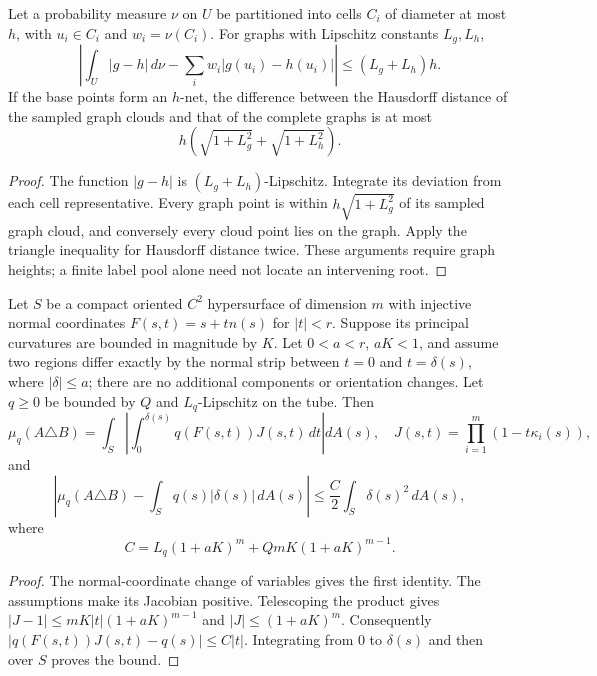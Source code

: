 \begin{proposition}
\label{rthreegeo:quadrature}
Let a probability measure $\nu$ on $U$ be partitioned into cells $C_i$
of diameter at most $h$, with $u_i\in C_i$ and $w_i=\nu(C_i)$.
For graphs with Lipschitz constants $L_g,L_h$,
\[
 \left|\int_U|g-h|\,d\nu-
 \sum_iw_i|g(u_i)-h(u_i)|\right|\le(L_g+L_h)h.
\]
If the base points form an $h$-net, the difference between the Hausdorff
distance of the sampled graph clouds and that of the complete graphs
is at most
\[
 h\left(\sqrt{1+L_g^2}+\sqrt{1+L_h^2}\right).
\]
\end{proposition}
\begin{proof}
The function $|g-h|$ is $(L_g+L_h)$-Lipschitz. Integrate its deviation
from each cell representative. Every graph point is within
$h\sqrt{1+L_g^2}$ of its sampled graph cloud, and conversely every cloud
point lies on the graph. Apply the triangle inequality for Hausdorff
distance twice. These arguments require graph heights; a finite label
pool alone need not locate an intervening root.
\end{proof}

\begin{proposition}
\label{rthreegeo:tube}
Let $S$ be a compact oriented $C^2$ hypersurface of dimension $m$ with
injective normal coordinates $F(s,t)=s+tn(s)$ for $|t|<r$.
Suppose its principal curvatures are bounded in magnitude by $K$.
Let $0<a<r$, $aK<1$, and assume two regions differ exactly by the
normal strip between $t=0$ and $t=\delta(s)$, where $|\delta|\le a$;
there are no additional components or orientation changes.
Let $q\ge0$ be bounded by $Q$ and $L_q$-Lipschitz on the tube. Then
\[
 \mu_q(A\triangle B)=
 \int_S\left|\int_0^{\delta(s)}q(F(s,t))J(s,t)\,dt\right|dA(s),
 \quad J(s,t)=\prod_{i=1}^m(1-t\kappa_i(s)),
\]
and
\[
 \left|\mu_q(A\triangle B)-\int_Sq(s)|\delta(s)|\,dA(s)\right|
 \le\frac C2\int_S\delta(s)^2\,dA(s),
\]
where
\[
 C=L_q(1+aK)^m+QmK(1+aK)^{m-1}.
\]
\end{proposition}
\begin{proof}
The normal-coordinate change of variables gives the first identity.
The assumptions make its Jacobian positive. Telescoping the product
gives
$|J-1|\le mK|t|(1+aK)^{m-1}$ and $|J|\le(1+aK)^m$.
Consequently
$|q(F(s,t))J(s,t)-q(s)|\le C|t|$.
Integrating from $0$ to $\delta(s)$ and then over $S$ proves the bound.
\end{proof}

